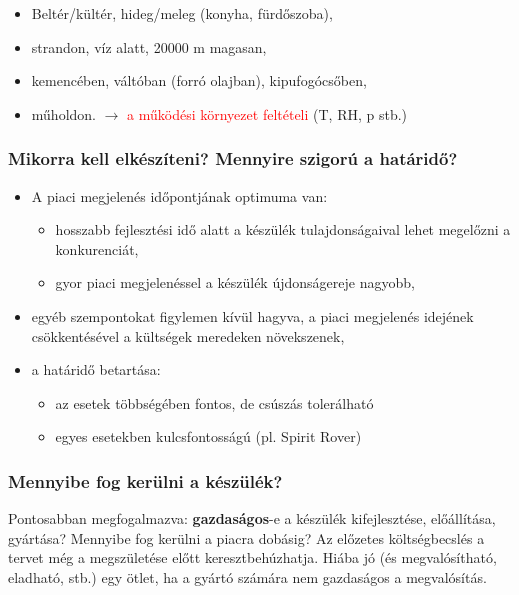 \documentclass[11pt]{article}
\begin{document}
				\begin{itemize}
					\item Beltér/kültér, hideg/meleg (konyha, fürdőszoba),
					\item strandon, víz alatt, 20000 m magasan, 
					\item kemencében, váltóban (forró olajban), kipufogócsőben,
					\item műholdon.
						\subitem $\rightarrow$ \textcolor{red}{a működési környezet feltételi} (T, RH, p stb.)
				\end{itemize}

			\subsubsection{Mikorra kell elkészíteni? Mennyire szigorú a határidő?}

				\begin{itemize}
					\item A piaci megjelenés időpontjának optimuma van:
					\begin{itemize}
						\item hosszabb fejlesztési idő alatt a készülék tulajdonságaival lehet megelőzni a konkurenciát,
						\item gyor piaci megjelenéssel a készülék újdonságereje nagyobb,
					\end{itemize}
					\item egyéb szempontokat figylemen kívül hagyva, a piaci megjelenés idejének csökkentésével a kültségek meredeken növekszenek,
					\item a határidő betartása:
					\begin{itemize}
						\item az esetek többségében fontos, de csúszás tolerálható
						\item  egyes esetekben kulcsfontosságú (pl. Spirit Rover)
					\end{itemize}
				\end{itemize}

			\subsubsection{Mennyibe fog kerülni a készülék?}

				Pontosabban megfogalmazva: \textbf{gazdaságos}-e a készülék kifejlesztése, előállítása, gyártása? Mennyibe fog kerülni a piacra dobásig? Az előzetes költségbecslés a tervet még a megszületése előtt keresztbehúzhatja. Hiába jó (és megvalósítható, eladható, stb.) egy ötlet, ha a gyártó számára nem gazdaságos a megvalósítás.
\end{document}
